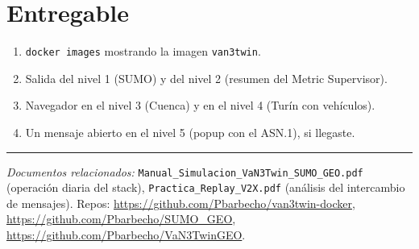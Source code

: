 \documentclass[11pt,a4paper]{article}
\begin{document}
\section{Entregable}

\begin{checkbox}
\begin{enumerate}[leftmargin=1.6em, itemsep=2pt]
  \item \texttt{docker images} mostrando la imagen \texttt{van3twin}.
  \item Salida del nivel 1 (SUMO) y del nivel 2 (resumen del Metric
        Supervisor).
  \item Navegador en el nivel 3 (Cuenca) y en el nivel 4 (Turín con
        vehículos).
  \item Un mensaje abierto en el nivel 5 (popup con el ASN.1), si llegaste.
\end{enumerate}
\end{checkbox}

\vspace{6pt}\hrule\vspace{6pt}

{\small\emph{Documentos relacionados:}
\texttt{Manual\_Simulacion\_VaN3Twin\_SUMO\_GEO.pdf} (operación diaria del
stack), \texttt{Practica\_Replay\_V2X.pdf} (análisis del intercambio de
mensajes). Repos: \url{https://github.com/Pbarbecho/van3twin-docker},
\url{https://github.com/Pbarbecho/SUMO_GEO},
\url{https://github.com/Pbarbecho/VaN3TwinGEO}.}
\end{document}
